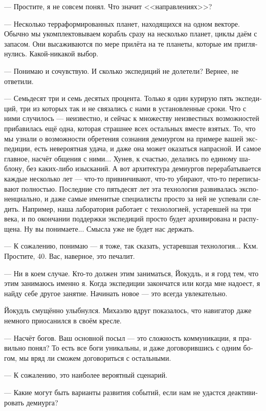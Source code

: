 \documentclass[a4paper,12pt,fleqn]{book}\usepackage{cooltooltips}\usepackage{polyglossia}\setdefaultlanguage[babelshorthands=true]{russian}\setotherlanguage{english}\defaultfontfeatures{Ligatures=TeX,Mapping=tex-text} \usepackage{xcolor}\definecolor{lightgray}{HTML}{bbbbbb}\color{lightgray}\newcommand{\ml}[3]{\textenglish{\textcolor{black}{#3}}}
\begin{document}
--- Простите, я не совсем понял.
Что значит <<направлениях>>?

--- Несколько терраформированных планет, находящихся на одном векторе.
Обычно мы укомплектовываем корабль сразу на несколько планет, циклы даём с запасом.
Они высаживаются по мере прилёта на те планеты, которые им приглянулись.
Какой-никакой выбор.

--- Понимаю и сочувствую.
И сколько экспедиций не долетели?
Вернее, не ответили.

--- Семьдесят три и семь десятых процента.
Только я один курирую пять экспедиций, три из которых так и не связались с нами в установленные сроки.
Что с ними случилось --- неизвестно, и сейчас к множеству неизвестных возможностей прибавилась ещё одна, которая страшнее всех остальных вместе взятых.
То, что мы узнали о возможности обретения сознания демиургом на примере вашей экспедиции, есть невероятная удача, и даже она может оказаться напрасной.
И самое главное, насчёт общения с ними...
Хунев, к счастью, делались по единому шаблону, без каких-либо изысканий.
А вот архитектура демиургов перерабатывается каждые несколько лет --- что-то привинчивают, что-то убирают, что-то переписывают полностью.
Последние сто пятьдесят лет эта технология развивалась экспоненциально, и даже самые именитые специалисты просто за ней не успевали следить.
Например, наша лаборатория работает с технологией, устаревшей на три века, и по окончании поддержки экспедиций просто будет архивирована и распущена.
Ну вы понимаете...
Смысла уже не будет нас держать.

--- К сожалению, понимаю --- я тоже, так сказать, устаревшая технология...
Кхм.
Простите, 40.
Вас, наверное, это печалит.

--- Ни в коем случае.
Кто-то должен этим заниматься, Йокудль, и я горд тем, что этим занимаюсь именно я.
Когда экспедиции закончатся или когда мне надоест, я найду себе другое занятие.
Начинать новое --- это всегда увлекательно.

Йокудль смущённо улыбнулся.
Михаэлю вдруг показалось, что навигатор даже немного приосанился в своём кресле.

--- Насчёт богов.
Ваш основной посыл --- это сложность коммуникации, я правильно понял?
То есть все боги уникальны, и даже договорившись с одним богом, мы вряд ли сможем договориться с остальными.

--- К сожалению, это наиболее вероятный сценарий.

--- Какие могут быть варианты развития событий, если нам не удастся деактивировать демиурга?
\end{document}
